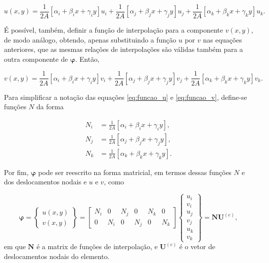 \begin{equation}
    u(x,y) = \frac{1}{2A} \left[ \alpha_i + \beta_i x + \gamma_i y \right] u_i + \frac{1}{2A} \left[ \alpha_j + \beta_j x + \gamma_j y \right] u_j + \frac{1}{2A} \left[ \alpha_k + \beta_k x + \gamma_k y \right] u_k.
    \label{eq:funcao_u}
\end{equation}

É possível, também, definir a função de interpolação para a componente $v(x,y)$, de modo análogo, obtendo, apenas substituindo a função $u$ por $v$ nas equações anteriores, que as mesmas relações de interpolações são válidas também para a outra componente de $\bm{\varphi}$. Então, 

\begin{equation}
    v(x,y) = \frac{1}{2A} \left[ \alpha_i + \beta_i x + \gamma_i y \right] v_i + \frac{1}{2A} \left[ \alpha_j + \beta_j x + \gamma_j y \right] v_j + \frac{1}{2A} \left[ \alpha_k + \beta_k x + \gamma_k y \right] v_k.
    \label{eq:funcao_v}
\end{equation}

Para simplificar a notação das equações \ref{eq:funcao_u} e \ref{eq:funcao_v}, define-se funções $N$ da forma

\begin{align}
    N_i &= \frac{1}{2A} \left[ \alpha_i + \beta_i x + \gamma_i y \right], \\
    N_j &= \frac{1}{2A} \left[ \alpha_j + \beta_j x + \gamma_j y \right], \\
    N_k &= \frac{1}{2A} \left[ \alpha_k + \beta_k x + \gamma_k y \right].
\end{align}

Por fim, $\bm{\varphi}$ pode ser reescrito na forma matricial, em termos dessas funções $N$ e dos deslocamentos nodais e $u$ e $v$, como

\begin{equation}
    \bm{\varphi} = \begin{Bmatrix}
        u(x,y) \\ v(x,y)
    \end{Bmatrix} = \begin{bmatrix}
        N_i & 0 & N_j & 0 & N_k & 0 \\
        0 & N_i & 0 & N_j & 0 & N_k
    \end{bmatrix} \begin{Bmatrix}
        u_i \\ v_i \\ u_j \\ v_j \\ u_k \\ v_k
    \end{Bmatrix} = \bm{N} \bm{U}^{(e)},
\end{equation}
em que $\bm{N}$ é a matrix de funções de interpolação, e $\bm{U}^{(e)}$ é o vetor de deslocamentos nodais do elemento.


